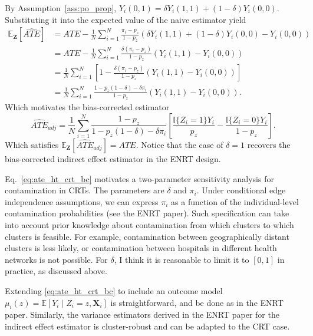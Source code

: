 \documentclass{article}[12pt]
\theoremstyle{definition}
\def \bZ {\boldsymbol{Z}}
\def \bX {\boldsymbol{X}}
\def \EX {\mathbb{E}}
\begin{document}
By Assumption~\ref{ass:po_prop}, $Y_i(0,1) = \delta Y_i(1,1) + (1-\delta)Y_i(0,0)$.
Substituting it into the expected value of the naive estimator yield
\begin{equation*}
    \begin{aligned}
        \EX_{\bZ}[\widehat{ATE}] &=
         ATE
        -
        \frac{1}{N}
        \sum_{i=1}^{N}
        \frac{
            \pi_i-p_z 
        }{
            1-p_z
        }
        \left(\delta Y_i(1,1) + (1-\delta)Y_i(0,0)
         - Y_i(0,0)\right)
         \\&= 
         ATE
         -
         \frac{1}{N}
        \sum_{i=1}^{N}
        \frac{
            \delta(\pi_i-p_z)
        }{
            1-p_z
        }
        \left(Y_i(1,1) - Y_i(0,0)\right)
        \\ &=
        \frac{1}{N}
        \sum_{i=1}^{N}
        \left[
         1 - 
       \frac{
            \delta(\pi_i-p_z)
        }{
            1-p_z
        }
        \left(Y_i(1,1) - Y_i(0,0)\right)  
        \right] 
        \\ &=
        \frac{1}{N}
        \sum_{i=1}^{N}
        \frac{
            1 - p_z(1-\delta) - \delta \pi_i
        }{
            1-p_z
        }
        \left(Y_i(1,1) - Y_i(0,0)\right).
    \end{aligned}
\end{equation*}
Which motivates the bias-corrected estimator
\begin{equation}
    \label{eq:ate_ht_crt_bc}
        \widehat{ATE}_{adj} =
        \frac{1}{N}
        \sum_{i=1}^{N}
        \frac{1 - p_z}{
             1 - p_z(1-\delta) - \delta \pi_i
        }
        \left[
        \frac{  
        \mathbb{I}\{Z_i=1\}Y_i}{p_z}
        -
        \frac{
        \mathbb{I}\{Z_i=0\}Y_i}{1 - p_z}
        \right].
\end{equation}
Which satisfies $\EX_{\bZ}[\widehat{ATE}_{adj}] = ATE$.
Notice that the case of $\delta=1$ recovers the bias-corrected indirect 
effect estimator in the ENRT design.

Eq.~\eqref{eq:ate_ht_crt_bc} motivates a two-parameter sensitivity analysis
for contamination in CRTs. The parameters are $\delta$ and $\pi_i$.
Under conditional edge independence assumptions, we can express $\pi_i$ as a function of
the individual-level contamination probabilities (see the ENRT paper).
Such specification can take into account prior knowledge about 
contamination from which clusters to which clusters is feasible.
For example, contamination between geographically distant clusters is less likely,
or contamination between hospitals in different health networks is not possible.
For $\delta$, I think it is reasonable to limit it to $[0,1]$ in practice,
as discussed above.

Extending \eqref{eq:ate_ht_crt_bc} to include an outcome model 
$\mu_i(z) = \EX[Y_i \mid Z_i=z, \bX_i]$ is straightforward,
and be done as in the ENRT paper.
Similarly, the variance estimators derived in the ENRT paper 
for the indirect effect estimator is cluster-robust and can be adapted to the CRT case.
\end{document}
